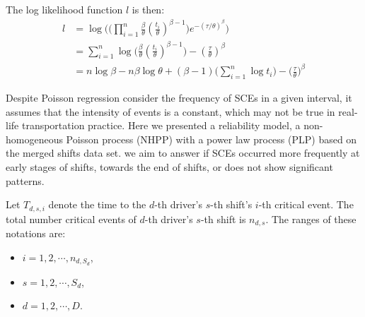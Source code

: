 \documentclass[12pt]{book}
\numberwithin{equation}{chapter}
\begin{document}
The log likelihood function \(l\) is then:
\begin{equation}\label{logtau}
\begin{aligned}
l & = \log \Bigg(\Big(\prod_{i=1}^n\frac{\beta}{\theta}(\frac{t_i}{\theta})^{\beta - 1}\Big)e^{-(\tau/\theta)^\beta}\Bigg)\\
& = \sum_{i=1}^n\log\Big(\frac{\beta}{\theta}(\frac{t_i}{\theta})^{\beta - 1}\Big) - (\frac{\tau}{\theta})^\beta\\
& = n\log\beta - n\beta\log\theta + (\beta - 1)\bigg(\sum_{i=1}^n\log t_i\bigg) - \Big(\frac{\tau}{\theta}\Big)^\beta
\end{aligned}
\end{equation}

Despite Poisson regression consider the frequency of SCEs in a given interval, it assumes that the intensity of events is a constant, which may not be true in real-life transportation practice. Here we presented a reliability model, a non-homogeneous Poisson process (NHPP) with a power law process (PLP) based on the merged shifts data set. we aim to answer if SCEs occurred more frequently at early stages of shifts, towards the end of shifts, or does not show significant patterns.

Let \(T_{d, s, i}\) denote the time to the \(d\)-th driver's \(s\)-th shift's \(i\)-th critical event. The total number critical events of \(d\)-th driver's \(s\)-th shift is \(n_{d,s}\). The ranges of these notations are:

\begin{itemize}
\item $i = 1, 2, \cdots, n_{d, S_d}$,
\item $s = 1, 2, \cdots, S_d$,
\item $d = 1, 2, \cdots, D$.
\end{itemize}
\end{document}
